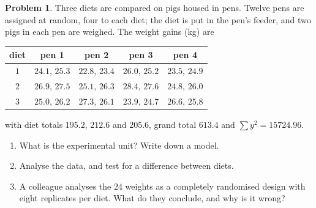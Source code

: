 \documentclass[11pt,a4paper]{article}
\numberwithin{equation}{section}
\theoremstyle{definition}
\newtheorem{problemx}{Problem}[subsection]
\newenvironment{problem}{\begin{problemx}}{\end{problemx}}
\begin{document}
\begin{problem}\label{prob:subsampling}
Three diets are compared on pigs housed in pens. Twelve pens are assigned at random, four to each diet; the diet is put in the pen's feeder, and two pigs
in each pen are weighed. The weight gains (kg) are
\begin{center}
\begin{tabular}{c|cccc}
diet & pen 1 & pen 2 & pen 3 & pen 4 \\
\hline
$1$ & $24.1$, $25.3$ & $22.8$, $23.4$ & $26.0$, $25.2$ & $23.5$, $24.9$ \\
$2$ & $26.9$, $27.5$ & $25.1$, $26.3$ & $28.4$, $27.6$ & $24.8$, $26.0$ \\
$3$ & $25.0$, $26.2$ & $27.3$, $26.1$ & $23.9$, $24.7$ & $26.6$, $25.8$
\end{tabular}
\end{center}
with diet totals $195.2$, $212.6$ and $205.6$, grand total $613.4$ and $\sum y^2 = 15724.96$.
\begin{enumerate}[label=(\alph*)]
\item What is the experimental unit? Write down a model.
\item Analyse the data, and test for a difference between diets.
\item A colleague analyses the $24$ weights as a completely randomised design with eight replicates per diet. What do they conclude, and why is it wrong?
\end{enumerate}
\end{problem}
\end{document}
